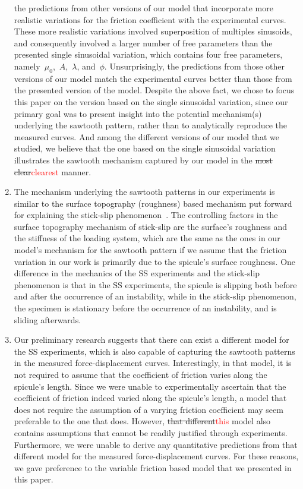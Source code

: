 \documentclass[preprint,10pt,times]{elsarticle}
\numberwithin{equation}{section}
\begin{document}
\begin{enumerate}
the predictions from other versions of our model that incorporate
more realistic variations for the friction coefficient with the experimental
curves. These more realistic variations involved superposition of
multiples sinusoids, and consequently involved a larger number of
free parameters than the presented single sinusoidal variation, which
contains four free parameters, namely~$\mu_0$,~$A$,~$\lambda$,
and~$\phi$. Unsurprisingly, the predictions from those other versions
of our model match the experimental curves better than those from
the presented version of the model. Despite the above fact, we chose
to focus this paper on the version based on the single sinusoidal
variation, since our primary goal was to present insight into the
potential mechanism(s) underlying the sawtooth pattern, rather than
to analytically reproduce the measured curves. And among the different
versions of our model that we studied, we believe that the one based
on the single sinusoidal variation illustrates the sawtooth mechanism
captured by our model in the \sout{most clear}\textcolor{red}{clearest} manner.
\item The mechanism underlying the sawtooth patterns in our experiments
is similar to the surface topography (roughness) based mechanism put
forward for explaining the stick-slip phenomenon~\cite{rabinowicz1966friction,mora1994simulation,berman1996origin}.
The controlling factors in the surface topography mechanism of stick-slip
are the surface's roughness and the stiffness of the loading system,
which are the same as the ones in our model's mechanism for the sawtooth
pattern if we assume that the friction variation in our work is primarily
due to the spicule's surface roughness. One difference in the mechanics
of the SS experiments and the stick-slip phenomenon is that in the
SS experiments, the spicule is slipping both before and after the occurrence
of an instability, while in the stick-slip phenomenon, the specimen
is stationary before the occurrence of an instability, and is sliding
afterwards.
\item Our preliminary research suggests that there can exist a different
model for the SS experiments, which is also capable of capturing the
sawtooth patterns in the measured force-displacement curves. Interestingly,
in that model, it is not required to assume that the coefficient of
friction varies along the spicule's length. Since we were unable to
experimentally ascertain that the coefficient of friction indeed varied
along the spicule's length, a model that does not require the assumption
of a varying friction coefficient may seem preferable to the
one that does. However, \sout{that different}\textcolor{red}{this} model also contains assumptions
that cannot be readily justified through experiments. Furthermore,
we were unable to derive any quantitative predictions from that different
model for the measured force-displacement curves. For these reasons,
we gave preference to the variable friction based model that we presented
in this paper.
\end{enumerate}
\end{document}
